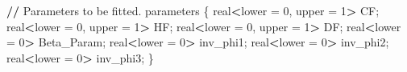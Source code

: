 \documentclass[10pt,letterpaper]{article}
\newenvironment{Shaded}{\begin{snugshade}}{\end{snugshade}}
\newcommand{\DecValTok}[1]{\textcolor[rgb]{0.00,0.00,0.81}{#1}}
\newcommand{\ErrorTok}[1]{\textcolor[rgb]{0.64,0.00,0.00}{\textbf{#1}}}
\newcommand{\NormalTok}[1]{#1}
\newcommand{\OtherTok}[1]{\textcolor[rgb]{0.56,0.35,0.01}{#1}}
\newcommand{\SpecialCharTok}[1]{\textcolor[rgb]{0.81,0.36,0.00}{\textbf{#1}}}
\begin{document}
\begin{Shaded}
\begin{Highlighting}[]
\SpecialCharTok{/}\ErrorTok{/}\NormalTok{ Parameters to be fitted.}
\NormalTok{parameters \{}
\NormalTok{  real}\SpecialCharTok{\textless{}}\NormalTok{lower }\OtherTok{=} \DecValTok{0}\NormalTok{, upper }\OtherTok{=} \DecValTok{1}\SpecialCharTok{\textgreater{}}\NormalTok{ CF;}
\NormalTok{  real}\SpecialCharTok{\textless{}}\NormalTok{lower }\OtherTok{=} \DecValTok{0}\NormalTok{, upper }\OtherTok{=} \DecValTok{1}\SpecialCharTok{\textgreater{}}\NormalTok{ HF;}
\NormalTok{  real}\SpecialCharTok{\textless{}}\NormalTok{lower }\OtherTok{=} \DecValTok{0}\NormalTok{, upper }\OtherTok{=} \DecValTok{1}\SpecialCharTok{\textgreater{}}\NormalTok{ DF;}
\NormalTok{  real}\SpecialCharTok{\textless{}}\NormalTok{lower }\OtherTok{=} \DecValTok{0}\SpecialCharTok{\textgreater{}}\NormalTok{ Beta\_Param;}
\NormalTok{  real}\SpecialCharTok{\textless{}}\NormalTok{lower }\OtherTok{=} \DecValTok{0}\SpecialCharTok{\textgreater{}}\NormalTok{ inv\_phi1;}
\NormalTok{  real}\SpecialCharTok{\textless{}}\NormalTok{lower }\OtherTok{=} \DecValTok{0}\SpecialCharTok{\textgreater{}}\NormalTok{ inv\_phi2;}
\NormalTok{  real}\SpecialCharTok{\textless{}}\NormalTok{lower }\OtherTok{=} \DecValTok{0}\SpecialCharTok{\textgreater{}}\NormalTok{ inv\_phi3;}
\NormalTok{\}}


\end{Highlighting}
\end{Shaded}
\end{document}
